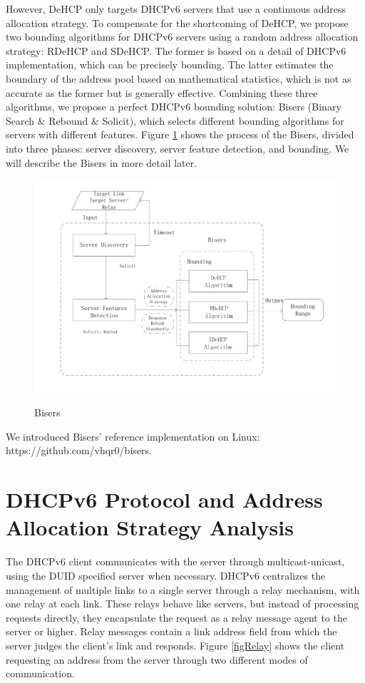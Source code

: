 \documentclass[conference]{IEEEtran}
\begin{document}
However, DeHCP only targets DHCPv6 servers that use a continuous
address allocation strategy. To compensate for the shortcoming of
DeHCP, we propose two bounding algorithms for DHCPv6 servers using a
random address allocation strategy: RDeHCP and SDeHCP. The former is
based on a detail of DHCPv6 implementation, which can be precisely
bounding. The latter estimates the boundary of the address pool based
on mathematical statistics, which is not as accurate as the former but
is generally effective. Combining these three algorithms, we propose a
perfect DHCPv6 bounding solution: Bisers (Binary Search \& Rebound \&
Solicit), which selects different bounding algorithms for servers with
different features. Figure \ref{figBisers} shows the process of the
Bisers, divided into three phases: server discovery, server feature
detection, and bounding. We will describe the Bisers in more detail
later.

\begin{figure}[htbp]
  \caption{Bisers}
  \label{figBisers}
  \centering
  \includegraphics[scale=0.4]{bisers.pdf} \\
\end{figure}

We introduced Bisers' reference implementation on Linux:
https://github.com/vhqr0/bisers.

\section{DHCPv6 Protocol and Address Allocation Strategy Analysis}

The DHCPv6 client communicates with the server through
multicast-unicast, using the DUID specified server when
necessary. DHCPv6 centralizes the management of multiple links to a
single server through a relay mechanism, with one relay at each
link. These relays behave like servers, but instead of processing
requests directly, they encapsulate the request as a relay message
agent to the server or higher. Relay messages contain a link address
field from which the server judges the client's link and
responds. Figure \ref{figRelay} shows the client requesting an address
from the server through two different modes of communication.
\end{document}
